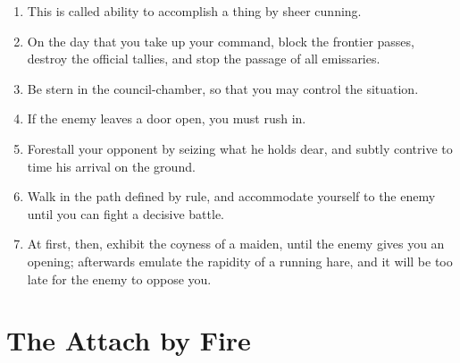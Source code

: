 \begin{enumerate}
  \item This is called ability to accomplish a thing by sheer cunning.

  \item On the day that you take up your command, block the frontier
    passes, destroy the official tallies, and stop the passage of all
    emissaries.

  \item Be stern in the council-chamber, so that you may control the
    situation.

  \item If the enemy leaves a door open, you must rush in.

  \item Forestall your opponent by seizing what he holds dear, and
    subtly contrive to time his arrival on the ground.

  \item Walk in the path defined by rule, and accommodate yourself to
    the enemy until you can fight a decisive battle.

  \item At first, then, exhibit the coyness of a maiden, until the
    enemy gives you an opening; afterwards emulate the rapidity of a
    running hare, and it will be too late for the enemy to oppose you.

  \end{enumerate}
\addtocounter{chapter}{1}\chapter*{The Attach by Fire}
